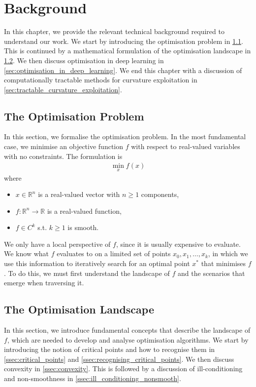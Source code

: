 \chapter{Background}
\label{chap:background}

In this chapter, we provide the relevant technical background required to understand our work. We start by introducing the optimisation problem in \cref{sec:optimisation_problem}. This is continued by a mathematical formulation of the optimisation landscape in \cref{sec:optimisation_landscape}. We then discuss optimisation in deep learning in \cref{sec:optimisation_in_deep_learning}. We end this chapter with a discussion of computationally tractable methods for curvature exploitation in \cref{sec:tractable_curvature_exploitation}.

\section{The Optimisation Problem}
\label{sec:optimisation_problem}

In this section, we formalise the optimisation problem. In the most fundamental case, we minimise an objective function $f$ with respect to real-valued variables with no constraints. The formulation is 
\begin{align}
    \min_{x} f(x)
\end{align}
where
\begin{itemize}
    \item $x \in \mathbb{R}^n$ is a real-valued vector with $n \geq 1$ components,
    \item $f: \mathbb{R}^n \to \mathbb{R}$ is a real-valued function,
    \item $f \in C^k$ s.t. $k \geq 1$ is smooth.
\end{itemize}
We only have a local perspective of $f$, since it is usually expensive to evaluate. We know what $f$ evaluates to on a limited set of points $x_0, x_1, \ldots, x_k$, in which we use this information to iteratively search for an optimal point $x^*$ that minimises $f$. To do this, we must first understand the landscape of $f$ and the scenarios that emerge when traversing it.

\section{The Optimisation Landscape}
\label{sec:optimisation_landscape}
In this section, we introduce fundamental concepts that describe the landscape of $f$, which are needed to develop and analyse optimisation algorithms. We start by introducing the notion of critical points and how to recognise them in \cref{ssec:critical_points} and \cref{ssec:recognising_critical_points}. We then discuss convexity in \cref{ssec:convexity}. This is followed by a discussion of ill-conditioning and non-smoothness in \cref{ssec:ill_conditioning_nonsmooth}.


